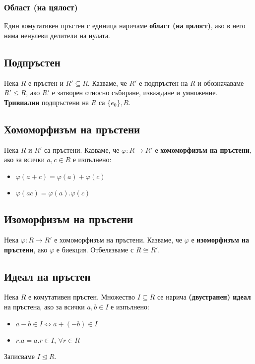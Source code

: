 \documentclass[fleqn,12pt]{article}
\begin{document}
\subsubsection{Област (на цялост)}
Един комутативен пръстен с единица наричаме \textbf{област (на цялост)}, ако в него
няма ненулеви делители на нулата.

\subsection{Подпръстен}
Нека $R$ е пръстен и $R' \subseteq R$. Казваме, че $R'$ е подпръстен на $R$ и 
обозначаваме $R' \leq R$, ако $R'$ е затворен относно събиране, изваждане и умножение.
\textbf{Тривиални} подпръстени на $R$ са $\{e_0\}, R$.

\subsection{Хомоморфизъм на пръстени}
Нека $R$ и $R'$ са пръстени. Казваме, че $\varphi : R \rightarrow R'$ е \textbf{хомоморфизъм на пръстени},
ако за всички $a,c \in R$ е изпълнено:
\begin{itemize}
    \item $\varphi(a + c) = \varphi(a) + \varphi(c)$
    \item $\varphi(ac) = \varphi(a) . \varphi(c)$
\end{itemize}

\subsection{Изоморфизъм на пръстени}
Нека $\varphi : R \rightarrow R'$ е хомоморфизъм на пръстени.
Казваме, че $\varphi$ е \textbf{изоморфизъм на пръстени}, ако $\varphi$ е биекция.
Отбелязваме с $R \cong R'$.

\subsection{Идеал на пръстен}
Нека $R$ е комутативен пръстен. Множество $I \subseteq R$ се нарича
\textbf{(двустранен) идеал} на пръстена, ако за всички $a,b \in I$ е изпълнено:
\begin{itemize}
    \item $a - b \in I \Leftrightarrow a + (-b) \in I$
    \item $r.a = a.r \in I$, $\forall r \in R$
\end{itemize}

Записваме $I \trianglelefteq R$.
\end{document}
